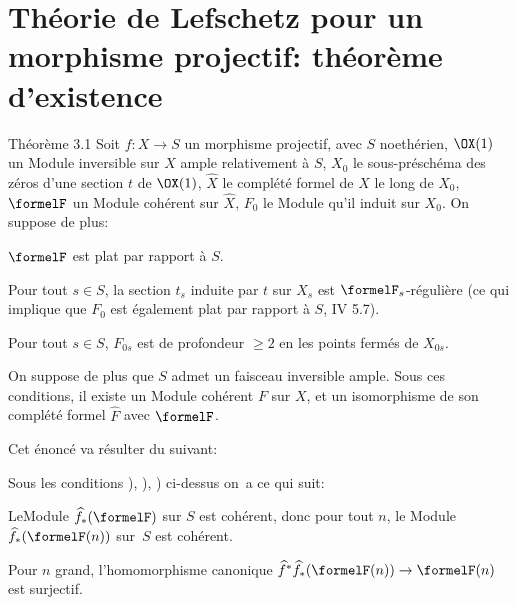\section[Th\'eorie de Lefschetz pour un morphisme projectif: existence]{Th\'eorie de Lefschetz pour un morphisme projectif: th\'eor\`eme d'existence}\label{XII.3}%

\setcounter{equation}{16}%
\label{XII.3.1}%
\begin{enonce*}{Th\'eor\`eme 3.1\ndemark}
Soit $f:X\to S$ un morphisme projectif, avec $S$ noeth\'erien, $\OX(1)$ un Module inversible sur $X$ ample relativement \`a $S$, $X_0$ le sous-pr\'esch\'ema des z\'eros d'une section $t$ de $\OX(1)$, $\widehat{X}$ le compl\'et\'e formel de $X$ le long de $X_0$, $\formelF$ un Module coh\'erent sur $\widehat{X}$, $F_0$ le Module qu'il induit sur $X_0$. On suppose de plus:
\begin{enumeratea}
\item\label{XII.3.1a}
$\formelF$ est plat par rapport \`a $S$.
\item\label{XII.3.1b}
Pour tout $s\in S$, la section $t_s$ induite par $t$ sur $X_s$ est $\formelF_s$-r\'eguli\`ere (ce qui implique que $F_0$ est \'egalement plat par rapport \`a $S$, \cf \textup{ IV 5.7}).
\item\label{XII.3.1c}
Pour tout $s\in S$, $F_{0s}$ est de profondeur $\geq 2$ en les points ferm\'es de $X_{0s}$.
\end{enumeratea}
On suppose de plus que $S$ admet un faisceau inversible ample. Sous ces conditions, il existe un Module coh\'erent $F$ sur $X$, et un isomorphisme de son compl\'et\'e formel $\widehat{F}$ avec $\formelF$.
\end{enonce*}

Cet \'enonc\'e va r\'esulter du suivant:

\begin{corollaire} \label{XII.3.2}
Sous les conditions ), ), ) ci-dessus on~a ce qui suit:
\begin{enumeratei}
\item
Le\pageoriginale Module $\widehat{f}_\ast(\formelF)$ sur $S$ est coh\'erent, donc pour tout $n$, le Module $\widehat{f}_\ast(\formelF(n))$ sur~$S$ est coh\'erent.
\item
Pour $n$ grand, l'homomorphisme canonique $\widehat{f}^\ast\widehat{f}_\ast(\formelF(n))\to \formelF(n)$ est surjectif.
\end{enumeratei}
\end{corollaire}

